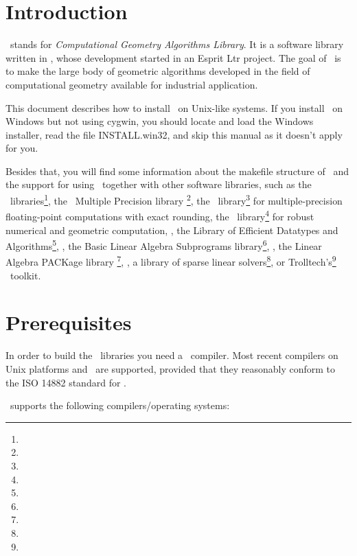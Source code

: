 \newcommand{\TTindex}[1]{\index{#1@{\tt #1}}}
\newcommand{\TTsubindex}[2]{\index{#1@{\tt #1}!{#2}}}
\newcommand{\TTsubindextwo}[2]{\index{#1!#2@{\tt #2} }}

\section{Introduction}

\cgal\ stands for \textit{Computational Geometry Algorithms Library}.
It is a software library written in \CC, whose development started in
an {\sc Esprit Ltr} project. The goal of \cgal\ is to make the large
body of geometric algorithms developed in the field of computational
geometry available for industrial application.

This document describes how to install \cgal\ on Unix-like systems.
If you install \cgal\ on Windows but not using cygwin, you should locate
and load the Windows installer, read the file INSTALL.win32, and skip
this manual as it doesn't apply for you.

Besides that, you will find some information about the makefile
structure of \cgal\ and the support for using \cgal\ together with
other software libraries, such as the \boost\
libraries\footnote{\boostpage}, the \gnu\ Multiple Precision library
\gmp\footnote{\gmppage}, the \mpfr\ library\footnote{\mpfrpage} for
multiple-precision floating-point computations with exact rounding,
the \core\ library\footnote{\corepage} for robust numerical and
geometric computation, \leda, the Library of Efficient Datatypes and
Algorithms\footnote{\ledapage}, \blas, the Basic Linear Algebra Subprograms
library\footnote{\blaspage}, \lapack, the Linear Algebra PACKage library
\footnote{\lapackpage}, \taucs, a library of sparse linear
solvers\footnote{\taucspage}, or Trolltech's\footnote{\trolltechpage}
\qt\ toolkit.

\section{Prerequisites\label{sec:prerequisites}}

In order to build the \cgal\ libraries you need a \CC\ compiler.  Most
recent compilers on Unix platforms and \mswin\ are supported, provided
that they reasonably conform to the ISO 14882 standard for \CC.

\cgaldir\ supports the following compilers/operating systems:


